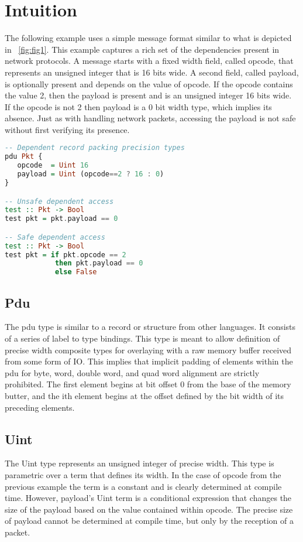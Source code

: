 \section{Intuition}

The following example uses a simple message format similar to what is depicted
in ~\ref{fig:fig1}. This example captures a rich set of the dependencies present
in network protocols. A message starts with a fixed width field, called opcode,
that represents an unsigned integer that is 16 bits wide. A second field, called
payload, is optionally present and depends on the value of opcode. If the opcode
contains the value 2, then the payload is present and is an unsigned integer 16
bits wide. If the opcode is not 2 then payload is a 0 bit width type, which 
implies its absence. Just as with handling network packets, accessing the 
payload is not safe without first verifying its presence.

\begin{lstlisting}[language=Haskell]
-- Dependent record packing precision types
pdu Pkt {
   opcode  = Uint 16
   payload = Uint (opcode==2 ? 16 : 0)
}

-- Unsafe dependent access
test :: Pkt -> Bool
test pkt = pkt.payload == 0

-- Safe dependent access
test :: Pkt -> Bool
test pkt = if pkt.opcode == 2 
            then pkt.payload == 0 
            else False
\end{lstlisting}

\subsection{Pdu}

The pdu type is similar to a record or structure from other languages. It
consists of a series of label to type bindings. This type is meant to allow
definition of precise width composite types for overlaying with a raw memory
buffer received from some form of IO. This implies that implicit padding of
elements within the pdu for byte, word, double word, and quad word alignment
are strictly prohibited. The first element begins at bit offset 0 from the base
of the memory butter, and the ith element begins at the offset defined by the
bit width of its preceding elements.

\subsection{Uint}

The Uint type represents an unsigned integer of precise width. This type is 
parametric over a term that defines its width. In the case of opcode from the
previous example the term is a constant and is clearly determined at compile
time. However, payload's Uint term is a conditional expression that changes
the size of the payload based on the value contained within opcode. The precise
size of payload cannot be determined at compile time, but only by the reception
of a packet.

